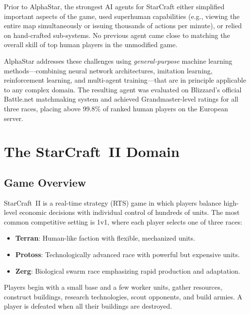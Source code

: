 \documentclass[11pt,a4paper]{article}
\begin{document}
Prior to AlphaStar, the strongest AI agents for StarCraft either simplified important aspects of the game, used superhuman capabilities (e.g., viewing the entire map simultaneously or issuing thousands of actions per minute), or relied on hand-crafted sub-systems. No previous agent came close to matching the overall skill of top human players in the unmodified game.

AlphaStar addresses these challenges using \emph{general-purpose} machine learning methods---combining neural network architectures, imitation learning, reinforcement learning, and multi-agent training---that are in principle applicable to any complex domain. The resulting agent was evaluated on Blizzard's official Battle.net matchmaking system and achieved Grandmaster-level ratings for all three races, placing above 99.8\% of ranked human players on the European server.

\section{The StarCraft~II Domain}

\subsection{Game Overview}

StarCraft~II is a real-time strategy (RTS) game in which players balance high-level economic decisions with individual control of hundreds of units. The most common competitive setting is 1v1, where each player selects one of three races:

\begin{itemize}[nosep]
    \item \textbf{Terran}: Human-like faction with flexible, mechanized units.
    \item \textbf{Protoss}: Technologically advanced race with powerful but expensive units.
    \item \textbf{Zerg}: Biological swarm race emphasizing rapid production and adaptation.
\end{itemize}

Players begin with a small base and a few worker units, gather resources, construct buildings, research technologies, scout opponents, and build armies. A player is defeated when all their buildings are destroyed.
\end{document}
